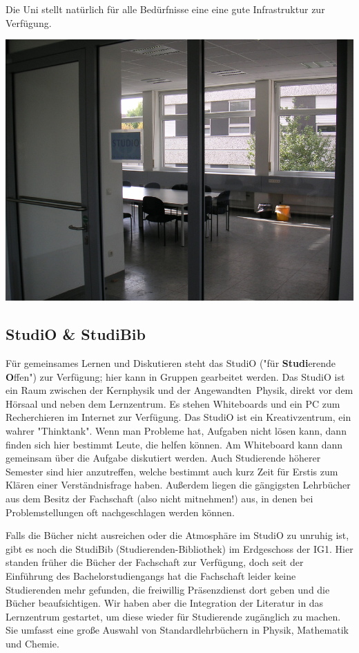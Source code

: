 \begin{multicols*}{2}
Die Uni stellt natürlich für alle Bedürfnisse eine eine gute Infrastruktur zur Verfügung.

\includegraphics[width=\columnwidth]{res/buecher_studio.png}

\subsection{StudiO \& StudiBib}
Für gemeinsames Lernen und Diskutieren steht das StudiO ("für \textbf{Studi}erende \textbf{O}ffen") zur Verfügung; hier kann in Gruppen gearbeitet werden.
Das StudiO ist ein Raum zwischen der Kernphysik und der Angewandten~Physik, direkt vor dem Hörsaal und neben dem Lernzentrum.
Es stehen Whiteboards und ein PC zum Recherchieren im Internet zur Verfügung.
Das StudiO ist ein Kreativzentrum, ein wahrer "Thinktank".
Wenn man Probleme hat, Aufgaben nicht lösen kann, dann finden sich hier bestimmt Leute, die helfen können.
Am Whiteboard kann dann gemeinsam über die Aufgabe diskutiert werden.
Auch Studierende höherer Semester sind hier anzutreffen, welche bestimmt auch kurz Zeit für Erstis zum Klären einer Verständnisfrage haben.
Außerdem liegen die gängigsten Lehrbücher aus dem Besitz der Fachschaft (also nicht mitnehmen!) aus, in denen bei Problemstellungen oft nachgeschlagen werden können.

Falls die Bücher nicht ausreichen oder die Atmosphäre im StudiO zu unruhig ist, gibt es noch die StudiBib (Studierenden-Bibliothek) im Erdgeschoss der IG1.
Hier standen früher die Bücher der Fachschaft zur Verfügung, doch seit der Einführung des Bachelorstudiengangs hat die Fachschaft leider keine Studierenden mehr gefunden, die freiwillig Präsenzdienst dort geben und die Bücher beaufsichtigen.
Wir haben aber die Integration der Literatur in das Lernzentrum gestartet, um diese wieder für Studierende zugänglich zu machen.
Sie umfasst eine große Auswahl von Standardlehrbüchern in Physik, Mathematik und Chemie.


\end{multicols*}
